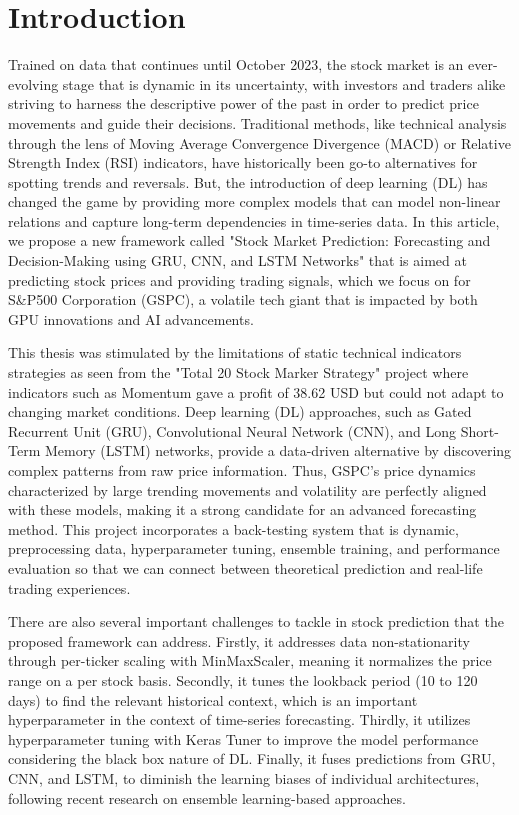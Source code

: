 \section{Introduction}
Trained on data that continues until October 2023, the stock market is an ever-evolving stage that is dynamic in its uncertainty, with investors and traders alike striving to harness the descriptive power of the past in order to predict price movements and guide their decisions. Traditional methods, like technical analysis through the lens of Moving Average Convergence Divergence (MACD) or Relative Strength Index (RSI) indicators, have historically been go-to alternatives for spotting trends and reversals. But, the introduction of deep learning (DL) has changed the game by providing more complex models that can model non-linear relations and capture long-term dependencies in time-series data. In this article, we propose a new framework called "Stock Market Prediction: Forecasting and Decision-Making using GRU, CNN, and LSTM Networks" that is aimed at predicting stock prices and providing trading signals, which we focus on for S\&P500 Corporation (GSPC), a volatile tech giant that is impacted by both GPU innovations and AI advancements.

This thesis was stimulated by the limitations of static technical indicators strategies as seen from the "Total 20 Stock Marker Strategy" project where indicators such as Momentum gave a profit of 38.62 USD but could not adapt to changing market conditions. Deep learning (DL) approaches, such as Gated Recurrent Unit (GRU), Convolutional Neural Network (CNN), and Long Short-Term Memory (LSTM) networks, provide a data-driven alternative by discovering complex patterns from raw price information. Thus, GSPC’s price dynamics characterized by large trending movements and volatility are perfectly aligned with these models, making it a strong candidate for an advanced forecasting method. This project incorporates a back-testing system that is dynamic, preprocessing data, hyperparameter tuning, ensemble training, and performance evaluation so that we can connect between theoretical prediction and real-life trading experiences.

There are also several important challenges to tackle in stock prediction that the proposed framework can address. Firstly, it addresses data non-stationarity through per-ticker scaling with MinMaxScaler, meaning it normalizes the price range on a per stock basis. Secondly, it tunes the lookback period (10 to 120 days) to find the relevant historical context, which is an important hyperparameter in the context of time-series forecasting. Thirdly, it utilizes hyperparameter tuning with Keras Tuner to improve the model performance considering the black box nature of DL. Finally, it fuses predictions from GRU, CNN, and LSTM, to diminish the learning biases of individual architectures, following recent research on ensemble learning-based approaches.

